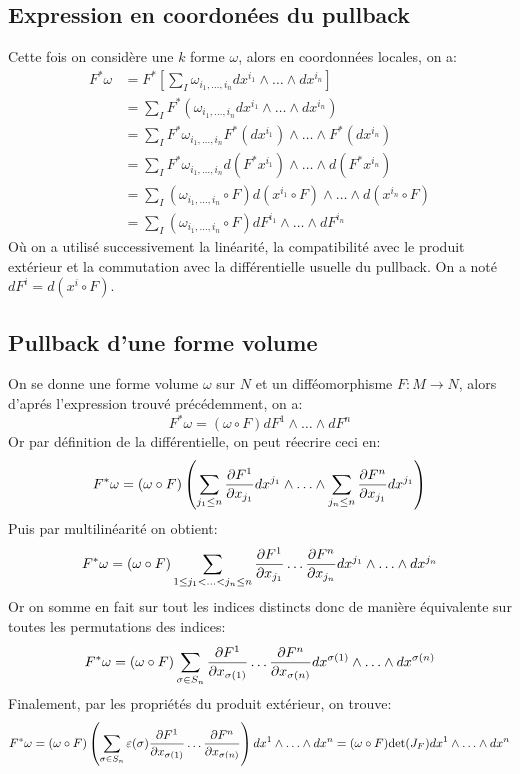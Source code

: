    \subsection*{Expression en coordonées du pullback}
      Cette fois on considère une $k$ forme $\omega$, alors en coordonnées locales, on a:
      \begin{align*}
      F^*\omega &= F^*\left[\sum_{I} \omega_{i_1, \ldots, i_n} dx^{i_1} \wedge \ldots \wedge dx^{i_n}\right]\\
      &= \sum_{I} F^*(\omega_{i_1, \ldots, i_n} dx^{i_1} \wedge \ldots \wedge dx^{i_n})\\
      &= \sum_{I} F^*\omega_{i_1, \ldots, i_n} F^*(dx^{i_1})  \wedge \ldots \wedge F^*(dx^{i_n})\\
      &= \sum_{I} F^*\omega_{i_1, \ldots, i_n} d(F^*x^{i_1})  \wedge \ldots \wedge d(F^*x^{i_n})\\
      &= \sum_{I} (\omega_{i_1, \ldots, i_n} \circ F) d(x^{i_1} \circ F)  \wedge \ldots \wedge d(x^{i_n} \circ F)\\
      &= \sum_{I} (\omega_{i_1, \ldots, i_n} \circ F) dF^{i_1}  \wedge \ldots \wedge  dF^{i_n}
      \end{align*}
      Où on a utilisé successivement la linéarité, la compatibilité avec le produit extérieur et la commutation avec la différentielle usuelle du pullback. On a noté $dF^i = d(x^i \circ F)$.
   \subsection*{Pullback d'une forme volume}
      On se donne une forme volume $\omega$ sur $N$ et un difféomorphisme $F : M \longrightarrow N$, alors d'aprés l'expression trouvé précédemment, on a:
      $$
          F^*\omega = (\omega \circ F) dF^{1}  \wedge \ldots \wedge  dF^{n}
      $$
      Or par définition de la différentielle, on peut réecrire ceci en:
      \[ 
         F^*\omega = (\omega \circ F) \left(\sum_{{j_1} \leq n} \frac{\partial F^{1}}{\partial x_{j_1}}dx^{j_1}  \wedge \ldots \wedge  \sum_{{j_n} \leq n} \frac{\partial F^{n}}{\partial x_{j_1}}dx^{j_1}\right)
      \]
      Puis par multilinéarité on obtient:
      \[ 
         F^*\omega = (\omega \circ F) \sum_{1 \leq j_1 < \ldots < j_n \leq n} \frac{\partial F^{1}}{\partial x_{j_1}}\ldots\frac{\partial F^{n}}{\partial x_{j_n}} dx^{j_1}  \wedge \ldots \wedge  dx^{j_n}
      \]
      Or on somme en fait sur tout les indices distincts donc de manière équivalente sur toutes les permutations des indices:
      \[ 
         F^*\omega = (\omega \circ F) \sum_{\sigma \in S_n} \frac{\partial F^{1}}{\partial x_{\sigma(1)}}\ldots\frac{\partial F^{n}}{\partial x_{\sigma(n)}} dx^{\sigma(1)}\wedge \ldots \wedge  dx^{\sigma(n)}
      \]
      Finalement, par les propriétés du produit extérieur, on trouve:
      \[ 
         F^*\omega = (\omega \circ F) \left(\sum_{\sigma \in S_n} \varepsilon(\sigma)\frac{\partial F^{1}}{\partial x_{\sigma(1)}}\ldots\frac{\partial F^{n}}{\partial x_{\sigma(n)}}\right) dx^{1}\wedge \ldots \wedge  dx^{n} = (\omega \circ F)\text{det}(J_F)dx^1 \wedge \ldots \wedge dx^n
      \]
   
